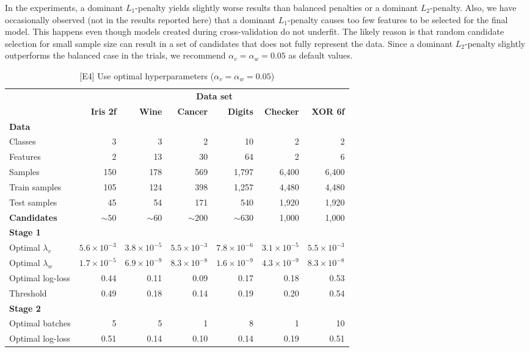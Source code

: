 %
\clearpage
%
In the experiments, a dominant $L_1$-penalty yields slightly worse results than balanced penalties or a dominant $L_2$-penalty.
Also, we have occasionally observed (not in the results reported here) that a dominant $L_1$-penalty causes too few features to be selected for the final model.
This happens even though models created during cross-validation do not underfit.
The likely reason is that random candidate selection for small sample size can result in a set of candidates that does not fully represent the data.
Since a dominant $L_2$-penalty slightly outperforms the balanced case in the trials, we recommend $\alpha_v=\alpha_w=0.05$ as default values.\par
%
\begin{table}
\caption{[E4] Use optimal hyperparameters ($\alpha_v=\alpha_w=0.05$)}
\label{tab_e4}
%
\begin{center}
\small
\begin{tabular}{|lrrrrrr|}
\hline
&\multicolumn{6}{c|}{\textbf{\hrulefill\ Data set \hrulefill}}\\
&\textbf{Iris 2f}&\textbf{Wine}&\textbf{Cancer}&\textbf{Digits}&\textbf{Checker}&\textbf{XOR 6f}\\
\multicolumn{7}{|l|}{\textbf{Data}}\\
Classes&3&3&2&10&2&2\\
Features&2&13&30&64&2&6\\
Samples&150&178&569&1,797&6,400&6,400\\
Train samples&105&124&398&1,257&4,480&4,480\\
Test samples&45&54&171&540&1,920&1,920\\
\textbf{Candidates}&$\sim50$&$\sim60$&$\sim200$&$\sim630$&1,000&1,000\\
\multicolumn{7}{|l|}{\textbf{Stage 1}}\\
Optimal $\lambda_v$&$5.6\times10^{-3}$&$3.8\times10^{-5}$&$5.5\times10^{-3}$&$7.8\times10^{-6}$&$3.1\times10^{-5}$&$5.5\times10^{-3}$\\
Optimal $\lambda_w$&$1.7\times10^{-5}$&$6.9\times10^{-9}$&$8.3\times10^{-8}$&$1.6\times10^{-9}$&$4.3\times10^{-9}$&$8.3\times10^{-8}$\\
Optimal log-loss&0.44&0.11&0.09&0.17&0.18&0.53\\
Threshold&0.49&0.18&0.14&0.19&0.20&0.54\\
\multicolumn{7}{|l|}{\textbf{Stage 2}}\\
Optimal batches&5&5&1&8&1&10\\
Optimal log-loss&0.51&0.14&0.10&0.14&0.19&0.51\\

\end{tabular}
\end{center}
\end{table}
